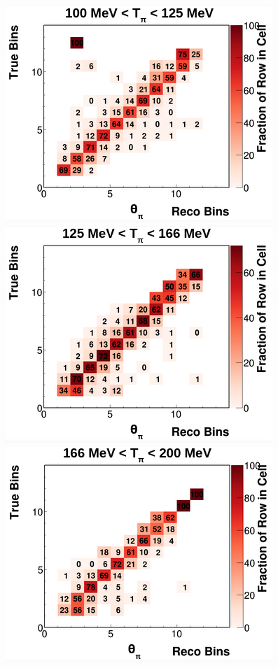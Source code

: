 \begin{figure}[!htb]
    \includegraphics[scale=0.33]{Figures/Chapter4/SignalDefinition/thetapi100to125tpi.png}
    \includegraphics[scale=0.33]{Figures/Chapter4/SignalDefinition/thetapi125to166tpi.png}
    \includegraphics[scale=0.33]{Figures/Chapter4/SignalDefinition/thetapi166to200tpi.png}

\end{figure}
